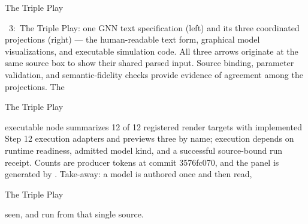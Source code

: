 \documentclass[
  ignorenonframetext,
]{beamer}
\newenvironment{archivecaptionframe}{\par\begingroup}{\par\endgroup}
\begin{document}
\begin{frame}{The Triple Play}

\begin{archivecaptionframe}

\figurename~3:\ The
Triple Play: one GNN text specification (left) and its three coordinated
projections (right) --- the human-readable text form, graphical model
visualizations, and executable simulation code. All three arrows
originate at the same source box to show their shared parsed input.
Source binding, parameter validation, and semantic-fidelity checks
provide evidence of agreement among the projections. The

\end{archivecaptionframe}

\end{frame}

\begin{frame}{The Triple Play}

\begin{archivecaptionframe}

executable node summarizes 12 of 12 registered render targets with
implemented Step 12 execution adapters and previews three by name;
execution depends on runtime readiness, admitted model kind, and a
successful source-bound run receipt. Counts are producer tokens at
commit 3576fc070, and the panel is generated by
. Take-away: a model is
authored once and then read,

\end{archivecaptionframe}

\end{frame}

\begin{frame}{The Triple Play}

\begin{archivecaptionframe}

seen, and run from that single source.

\end{archivecaptionframe}

\end{frame}
\end{document}
